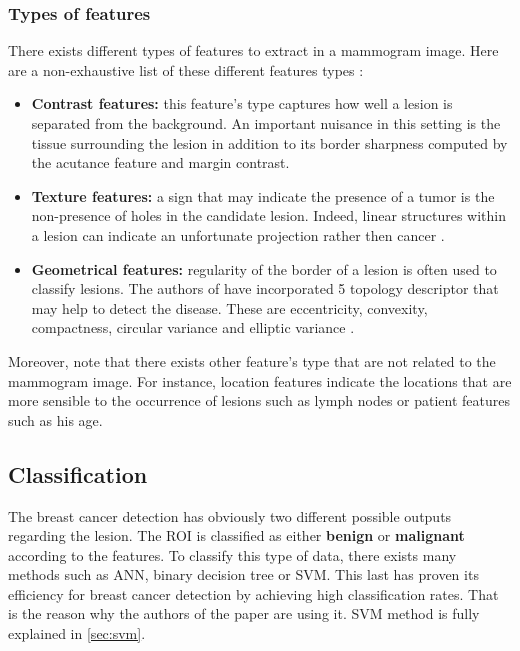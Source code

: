 \documentclass[11pt, openany]{report}
\theoremstyle{plain}
\theoremstyle{definition}
\theoremstyle{remark}
\begin{document}
\subsubsection{Types of features}
There exists different types of features to extract in a mammogram image. Here are a non-exhaustive list of these different features types \cite{breast-cancer-2}: 
\begin{itemize}
\item \textbf{Contrast features:} this feature's type captures how well a lesion is separated from the background. An important nuisance in this setting is the tissue surrounding the lesion in addition to its border sharpness computed by the acutance feature and margin contrast. 

\item \textbf{Texture features:} a sign that may indicate the presence of a tumor is the non-presence of holes in the candidate lesion. Indeed, linear structures within a lesion can indicate an unfortunate projection rather then cancer \cite{breast-cancer-2}. 

\item \textbf{Geometrical features:} regularity of the border of a lesion is often used to classify lesions. The authors of \cite{breast-cancer-2} have incorporated 5 topology descriptor that may help to detect the disease. These are eccentricity, convexity, compactness, circular variance and elliptic variance \cite{breast-cancer-2}. 
\end{itemize}

Moreover, note that there exists other feature's type that are not related to the mammogram image. For instance, location features indicate the locations that are more sensible to the occurrence of lesions such as lymph nodes or patient features such as his age. 


\subsection{Classification}
The breast cancer detection has obviously two different possible outputs regarding the lesion. The ROI is classified as either \textbf{benign} or \textbf{malignant} according to the features. To classify this type of data, there exists many methods such as ANN, binary decision tree or SVM. This last has proven its efficiency for breast cancer detection by achieving high classification rates. That is the reason why the authors of the paper are using it. SVM method is fully explained in \autoref{sec:svm}.  
\end{document}
